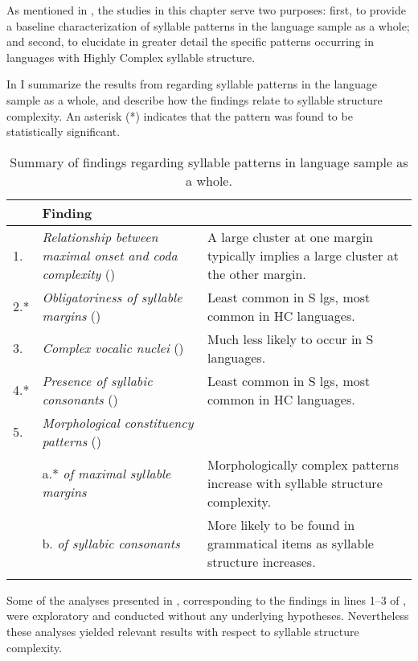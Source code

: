   As mentioned in , the studies in this chapter serve two purposes: first, to provide a baseline characterization of syllable patterns in the language sample as a whole; and second, to elucidate in greater detail the specific patterns occurring in languages with Highly Complex syllable structure.

  In  I summarize the results from  regarding syllable patterns in the language sample as a whole, and describe how the findings relate to syllable structure complexity. An asterisk (*) indicates that the pattern was found to be statistically significant.

\begin{table}
\begin{tabularx}{\textwidth}{l@{ }QI}
\lsptoprule
{} & {Finding}\\\midrule
{1.}  & \textit{Relationship between maximal onset and coda complexity} () & A large cluster at one margin typically implies a large cluster at the other margin.\\
{2.*} & \textit{Obligatoriness of syllable margins} () & Least common in S lgs, most common in HC languages.\\
{3.}  & \textit{Complex vocalic nuclei} () & Much less likely to occur in S languages.\\
{4.*} & \textit{Presence of syllabic consonants} () & Least common in S lgs, most common in HC languages.\\
{5.}  & \textit{Morphological constituency patterns} () & \\
      & {a.*} \textit{of maximal syllable margins} & Morphologically complex patterns increase with syllable structure complexity.\\
      & {b.} \textit{of syllabic consonants} &  More likely to be found in grammatical items as syllable structure increases.\\
\lspbottomrule
\end{tabularx}
\caption{\label{tab:3.18}Summary of findings regarding syllable patterns in language sample as a whole.}
\end{table}

Some of the analyses presented in , corresponding to the findings in lines 1--3 of , were exploratory and conducted without any underlying hypotheses. Nevertheless these analyses yielded relevant results with respect to syllable structure complexity.

